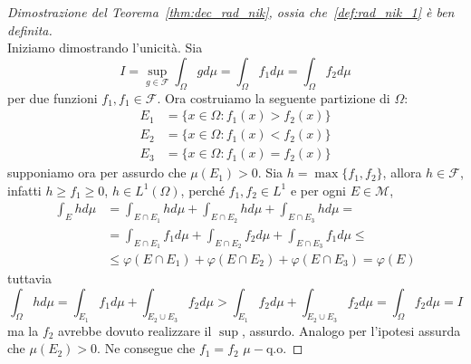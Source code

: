 \begin{proof}[Dimostrazione del Teorema~\ref{thm:dec_rad_nik}, ossia
    che~\ref{def:rad_nik_1} è ben definita] \(\)  \\
    Iniziamo dimostrando l'unicità. Sia 
    \[
        I = \sup_{g \in \mathcal{F}} \int_\Omega g d\mu = \int_\Omega f_{1} d\mu
        = \int_\Omega f_{2} d\mu
    \]
    per due funzioni \(f_{1} ,f_{1} \in \mathcal{F}\).
    Ora costruiamo la seguente partizione di \(\Omega\):
    \begin{align*}
        E_{1} &= \{ x \in \Omega : f_{1}{(x)} > f_{2}{(x)}\} \\
        E_{2} &= \{x \in \Omega : f_{1}{(x)} <f_{2}{(x)}\} \\
        E_{3} &= \{x \in \Omega : f_{1}{(x)} = f_{2}{(x)}\}
    \end{align*}
    supponiamo ora per assurdo che \(\mu{(E_{1})} > 0\). Sia \(h = \max \{f_{1},
    f_{2}\} \), allora \(h \in \mathcal{F}\), infatti \(h \ge f_{1} \ge 0\), \(h
    \in L^{1}{(\Omega)}\), perché \(f_{1}, f_{2} \in L^{1}\) e per ogni \(E \in
    \mathcal{M}\), 
    \begin{align*}
        \int_E h d\mu &= \int_{E \cap E_{1}} h d\mu + \int_{E \cap E_{2}} h d\mu
        + \int_{E \cap E_{3}} h d\mu =\\
        &= \int_{E \cap E_{1}} f_{1} d\mu + \int_{E \cap E_{2}} f_{2} d\mu +
        \int_{E \cap E_{3}} f_{1} d\mu \le \\
        &\le \varphi {(E \cap E_{1})} + \varphi {(E \cap E_{2})} + \varphi {(E
        \cap E_{3})} = \varphi {(E)}
    \end{align*}
    tuttavia
    \[
        \int_{\Omega} h d\mu = \int_{E_{1}} f_{1} d\mu + \int_{E_{2} \cup E_{3}} f_{2} d\mu
    > \int_{E_{1}} f_{2} d\mu + \int_{E_{2} \cup E_{3}} f_{2}
        d\mu = \int_{\Omega} f_{2} d\mu = I
    \]
    ma la \(f_{2}\) avrebbe dovuto realizzare il \(\sup\), assurdo. Analogo per
    l'ipotesi assurda che \(\mu(E_2) >0\). Ne consegue che \(f_{1} = f_{2}\,\,
    \mu-\)q.o.


\end{proof}

